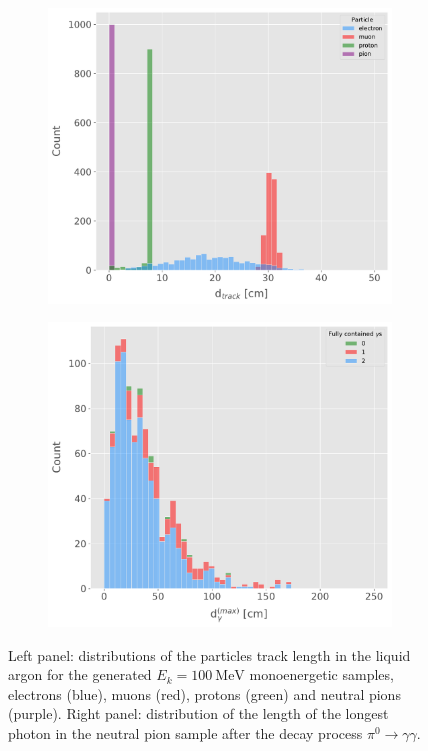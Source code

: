 \begin{figure}[t]
	\begin{subfigure}{0.5\textwidth}
		\centering
		\includegraphics[width=.99\linewidth]{Images/Matched_Filter/particle_length}
	\end{subfigure}
	\begin{subfigure}{0.5\textwidth}
		\centering
		\includegraphics[width=.99\linewidth]{Images/Matched_Filter/gamma_length}
	\end{subfigure}
	\caption[Distributions of the particles track length in the liquid argon for the generated single particle monoenergetic samples.]{Left panel: distributions of the particles track length in the liquid argon for the generated $E_{k} = 100 \ \mathrm{MeV}$ monoenergetic samples, electrons (blue), muons (red), protons (green) and neutral pions (purple). Right panel: distribution of the length of the longest photon in the neutral pion sample after the decay process $\pi^{0} \rightarrow \gamma\gamma$.}
	\label{fig:lengths}
\end{figure}

